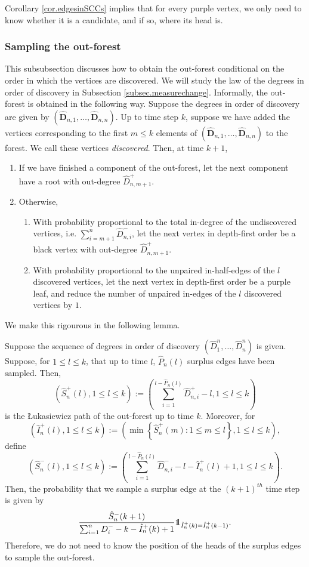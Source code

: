 Corollary \ref{cor.edgesinSCCs} implies that for every purple vertex, we only need to know whether it is a candidate, and if so, where its head is. 
\subsubsection{Sampling the out-forest}\label{subsubsec.samplingoutforest}
This subsubsection discusses how to obtain the out-forest conditional on the order in which the vertices are discovered. We will study the law of the degrees in order of discovery in Subsection \ref{subsec.measurechange}. Informally, the out-forest is obtained in the following way. Suppose the degrees in order of discovery are given by $(\mathbf{\hat{D}}_{n,1},\dots,\mathbf{\hat{D}}_{n,n})$. Up to time step $k$, suppose we have added the vertices corresponding to the first $m\leq k$ elements of  $(\mathbf{\hat{D}}_{n,1},\dots,\mathbf{\hat{D}}_{n,n})$ to the forest. We call these vertices \emph{discovered}. Then, at time $k+1$,
\begin{enumerate}
    \item If we have finished a component of the out-forest, let the next component have a root with out-degree $\hat{D}_{n,m+1}^+$. 
    \item Otherwise,
    \begin{enumerate}\item With probability proportional to the total in-degree of the undiscovered vertices, i.e. $\sum_{i={m+1}}^n \hat{D}_{n,i}^-$, let the next vertex in depth-first order be a black vertex with out-degree $\hat{D}_{n,m+1}^+$.
    \item With probability proportional to the unpaired in-half-edges of the $l$ discovered vertices, let the next vertex in depth-first order be a purple leaf, and reduce the number of unpaired in-edges of the $l$ discovered vertices by $1$.
\end{enumerate}
\end{enumerate}
We make this rigourous in the following lemma.
\begin{lemma}\label{lemma.sampleoutforest}
Suppose the sequence of degrees in order of discovery $(\hat{D}^n_1,\dots,\hat{D}^n_n)$ is given. Suppose, for $1\leq l\leq k$, that up to time $l$, $\hat{P}_n(l)$ surplus edges have been sampled. Then, $$\left(\hat{S}^+_n(l),1\leq l\leq k \right):=\left(\sum_{i=1}^{l-\hat{P}_n(l)}\hat{D}^+_{n,i}-l,1\leq l\leq k\right)$$ is the \L ukasiewicz path of the out-forest up to time $k$. Moreover, for $$\left(\hat{I}^+_n(l),1\leq l\leq k\right):=\left(\min\left\{\hat{S}^+_n(m):1\leq m \leq l\right\},1\leq l \leq k \right),$$
define 
$$\left(\hat{S}^-_n(l),1\leq l \leq k\right):=\left(\sum_{i=1}^{l-\hat{P}_n(l)}\hat{D}^-_{n,i}-l-\hat{I}^+_n(l)+1,1\leq l\leq k\right).$$
Then, the probability that we sample a surplus edge at the $(k+1)^{th}$ time step is given by
$$\frac{\hat{S}^-_n(k+1)}{\sum_{i=1}^n D^-_i-k-\hat{I}^+_n(k)+1}\one_{\hat{I}^+_n(k)=\hat{I}^+_n(k-1)}.$$
Therefore, we do not need to know the position of the heads of the surplus edges to sample the out-forest.
\end{lemma}
